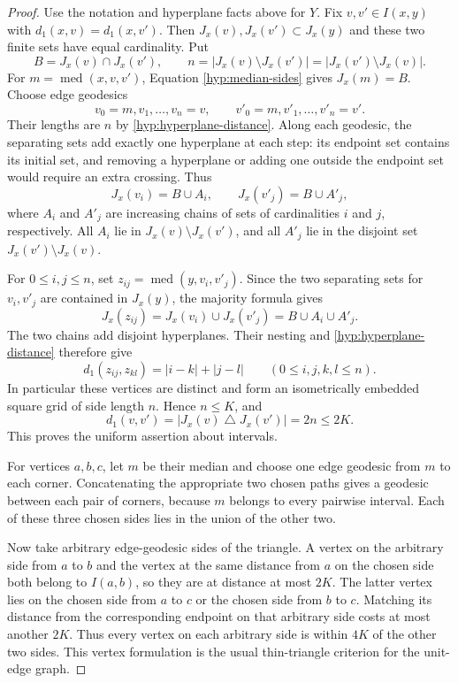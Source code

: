 \begin{proof}
Use the notation and hyperplane facts above for \(Y\).  Fix
\(v,v'\in I(x,y)\) with \(d_1(x,v)=d_1(x,v')\).  Then
\(J_x(v),J_x(v')\subset J_x(y)\) and these two finite sets have equal
cardinality.  Put
\[
B=J_x(v)\cap J_x(v'),\qquad
n=|J_x(v)\setminus J_x(v')|
 =|J_x(v')\setminus J_x(v)|.
\]
For \(m=\operatorname{med}(x,v,v')\), Equation
\eqref{hyp:median-sides} gives \(J_x(m)=B\).
Choose edge geodesics
\[
v_0=m,v_1,\ldots,v_n=v,\qquad
v'_0=m,v'_1,\ldots,v'_n=v'.
\]
Their lengths are \(n\) by \eqref{hyp:hyperplane-distance}.
Along each geodesic, the separating sets add exactly one hyperplane
at each step: its endpoint set contains its initial set, and removing
a hyperplane or adding one outside the endpoint set would require an
extra crossing.  Thus
\[
J_x(v_i)=B\cup A_i,\qquad
J_x(v'_j)=B\cup A'_j,
\]
where \(A_i\) and \(A'_j\) are increasing chains of sets of
cardinalities \(i\) and \(j\), respectively.  All \(A_i\) lie in
\(J_x(v)\setminus J_x(v')\), and all \(A'_j\) lie in the disjoint set
\(J_x(v')\setminus J_x(v)\).

For \(0\leq i,j\leq n\), set
\(z_{ij}=\operatorname{med}(y,v_i,v'_j)\).
Since the two separating sets for \(v_i,v'_j\) are contained in
\(J_x(y)\), the majority formula gives
\[
J_x(z_{ij})=J_x(v_i)\cup J_x(v'_j)=B\cup A_i\cup A'_j.
\]
The two chains add disjoint hyperplanes.  Their nesting and
\eqref{hyp:hyperplane-distance} therefore give
\[
d_1(z_{ij},z_{kl})=|i-k|+|j-l|
\qquad (0\leq i,j,k,l\leq n).
\]
In particular these vertices are distinct and form an isometrically
embedded square grid of side length \(n\).  Hence \(n\leq K\), and
\[
d_1(v,v')=|J_x(v)\mathbin{\triangle}J_x(v')|=2n\leq2K.
\]
This proves the uniform assertion about intervals.

For vertices \(a,b,c\), let \(m\) be their median and choose one edge
geodesic from \(m\) to each corner.  Concatenating the appropriate
two chosen paths gives a geodesic between each pair of corners,
because \(m\) belongs to every pairwise interval.  Each of these
three chosen sides lies in the union of the other two.

Now take arbitrary edge-geodesic sides of the triangle.  A vertex on
the arbitrary side from \(a\) to \(b\) and the vertex at the same
distance from \(a\) on the chosen side both belong to \(I(a,b)\), so
they are at distance at most \(2K\).  The latter vertex lies on the
chosen side from \(a\) to \(c\) or the chosen side from \(b\) to \(c\).
Matching its distance from the corresponding endpoint on that
arbitrary side costs at most another \(2K\).  Thus every vertex on
each arbitrary side is within \(4K\) of the other two sides.  This
vertex formulation is the usual thin-triangle criterion for the
unit-edge graph.
\end{proof}

